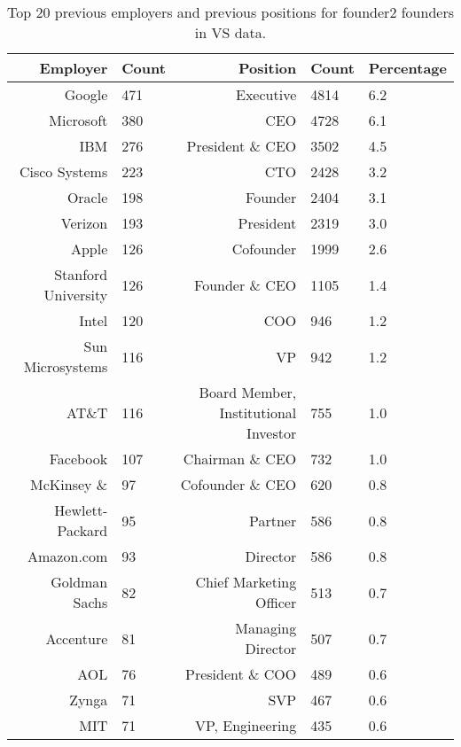 \begin{table}[!htb]
\centering
\begingroup\footnotesize
\begin{tabular}{rlrll}
  \toprule
Employer & Count & Position & Count & Percentage \\ 
  \midrule
Google & 471 & Executive & 4814 & 6.2 \\ 
  Microsoft & 380 & CEO & 4728 & 6.1 \\ 
  IBM & 276 & President \& CEO & 3502 & 4.5 \\ 
  Cisco Systems & 223 & CTO & 2428 & 3.2 \\ 
  Oracle & 198 & Founder & 2404 & 3.1 \\ 
  Verizon & 193 & President & 2319 & 3.0 \\ 
  Apple & 126 & Cofounder & 1999 & 2.6 \\ 
  Stanford University & 126 & Founder \& CEO & 1105 & 1.4 \\ 
  Intel & 120 & COO & 946 & 1.2 \\ 
  Sun Microsystems & 116 & VP & 942 & 1.2 \\ 
  AT\&T & 116 & Board Member, Institutional Investor & 755 & 1.0 \\ 
  Facebook & 107 & Chairman \& CEO & 732 & 1.0 \\ 
  McKinsey \& & 97 & Cofounder \& CEO & 620 & 0.8 \\ 
  Hewlett-Packard & 95 & Partner & 586 & 0.8 \\ 
  Amazon.com & 93 & Director & 586 & 0.8 \\ 
  Goldman Sachs & 82 & Chief Marketing Officer & 513 & 0.7 \\ 
  Accenture & 81 & Managing Director & 507 & 0.7 \\ 
  AOL & 76 & President \& COO & 489 & 0.6 \\ 
  Zynga & 71 & SVP & 467 & 0.6 \\ 
  MIT & 71 & VP, Engineering & 435 & 0.6 \\ 
   \bottomrule
\end{tabular}
\endgroup
\caption{Top 20 previous employers and previous positions for founder2 founders in VS data.} 
\label{table:VS_previousEmployersSummaryTable}
\end{table}
